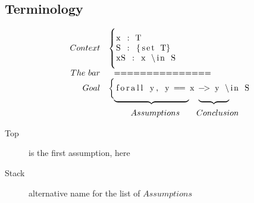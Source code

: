 \documentclass[10pt,a3paper]{article}
\begin{document}
\pagestyle{empty}

\begin{multicols*}{3}[\begin{center}\section*{}\end{center}]

\subsection*{Terminology}

$$
\begin{array}{rl}
	Context &
\left\{\begin{minipage}{0.14\textwidth}
\begin{lstlisting}
x : T
S : {set T}
xS : x \in S
\end{lstlisting}
\end{minipage}
\right.
\\
The~bar & \mathrm{~~\C{===============}}
\\
Goal &
\left\{
\begin{minipage}{0.20\textwidth}
\begin{lstlisting}
forall y, y == x -> y \in S
\end{lstlisting}
\end{minipage}
\right.
\\
& \raisebox{0.8em}[0em][0em]{$
~~\underbrace{~~~~~~~~~~~~~~~~~~~~~~~~~~~}_{}~~~\underbrace{~~~~~~~~~~~}_{}$}
\\
& ~~~~~~~~Assumptions~~~~~~Conclusion
\end{array}
$$

\begin{description}
\item[Top] is the first assumption,  here
\item[Stack] alternative name for the list of $Assumptions$
\end{description}


\end{multicols*}
\end{document}
